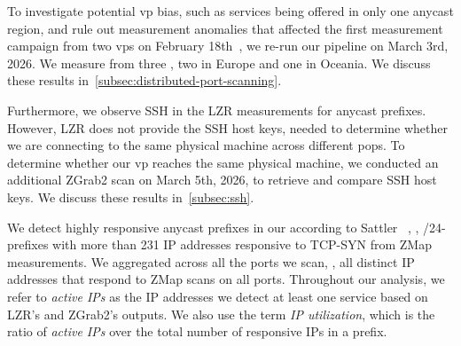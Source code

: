 To investigate potential \gls{vp} bias, such as services being offered in only one anycast region, and rule out measurement anomalies that affected the first measurement campaign from two \glspl{vp} on February 18th~\cite{10198985}, we re-run our pipeline on March 3rd, 2026.
We measure from three , two in Europe and one in Oceania.
We discuss these results in~\cref{subsec:distributed-port-scanning}.

Furthermore, we observe SSH in the LZR measurements for anycast prefixes.
However, LZR does not provide the SSH host keys, needed to determine whether we are connecting to the same physical machine across different \glspl{pop}.
To determine whether our \gls{vp} reaches the same physical machine, we conducted an additional ZGrab2 scan on March 5th, 2026, to retrieve and compare SSH host keys.
We discuss these results in~\cref{subsec:ssh}.


We detect highly responsive anycast prefixes in our \dataset according to Sattler \etal~\cite{SattlerEtAl_PackedBrimInvestigating_2023}, \ie, /24-prefixes with more than 231 IP addresses responsive to TCP-SYN from ZMap measurements.
We aggregated across all the ports we scan, \ie, all distinct IP addresses that respond to ZMap scans on all ports.
Throughout our analysis, we refer to \textit{active IPs} as the IP addresses we detect at least one service based on LZR's and ZGrab2's outputs. %
We also use the term \textit{IP utilization}, which is the ratio of \textit{active IPs} over the total number of responsive IPs in a prefix.

